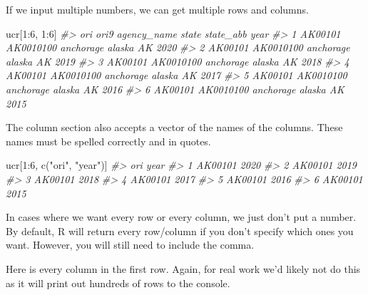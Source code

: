 \documentclass[
]{krantz}
\makeatletter
\newenvironment{Shaded}{\begin{snugshade}}{\end{snugshade}}
\newcommand{\CommentTok}[1]{\textcolor[rgb]{0.37,0.37,0.37}{\textit{#1}}}
\newcommand{\DecValTok}[1]{\textcolor[rgb]{0.06,0.06,0.06}{#1}}
\newcommand{\FunctionTok}[1]{\textcolor[rgb]{0,0,0}{#1}}
\newcommand{\NormalTok}[1]{#1}
\newcommand{\SpecialCharTok}[1]{\textcolor[rgb]{0,0,0}{#1}}
\newcommand{\StringTok}[1]{\textcolor[rgb]{0.5,0.5,0.5}{#1}}
\newenvironment{kframe}{%
\medskip{}
\setlength{\fboxsep}{.8em}
 \def\at@end@of@kframe{}%
 \ifinner\ifhmode%
  \def\at@end@of@kframe{\end{minipage}}%
  \begin{minipage}{\columnwidth}%
 \fi\fi%
 \def\FrameCommand##1{\hskip\@totalleftmargin \hskip-\fboxsep
 \colorbox{shadecolor}{##1}\hskip-\fboxsep
     \hskip-\linewidth \hskip-\@totalleftmargin \hskip\columnwidth}%
 \MakeFramed {\advance\hsize-\width
   \@totalleftmargin\z@ \linewidth\hsize
   \@setminipage}}%
 {\par\unskip\endMakeFramed%
 \at@end@of@kframe}
\renewenvironment{Shaded}{\begin{kframe}}{\end{kframe}}
\makeatother
\begin{document}
If we input multiple numbers, we can get multiple rows and
columns.

\begin{Shaded}
\begin{Highlighting}[]
\NormalTok{ucr[}\DecValTok{1}\SpecialCharTok{:}\DecValTok{6}\NormalTok{, }\DecValTok{1}\SpecialCharTok{:}\DecValTok{6}\NormalTok{]}
\CommentTok{\#\textgreater{}       ori      ori9 agency\_name  state state\_abb year}
\CommentTok{\#\textgreater{} 1 AK00101 AK0010100   anchorage alaska        AK 2020}
\CommentTok{\#\textgreater{} 2 AK00101 AK0010100   anchorage alaska        AK 2019}
\CommentTok{\#\textgreater{} 3 AK00101 AK0010100   anchorage alaska        AK 2018}
\CommentTok{\#\textgreater{} 4 AK00101 AK0010100   anchorage alaska        AK 2017}
\CommentTok{\#\textgreater{} 5 AK00101 AK0010100   anchorage alaska        AK 2016}
\CommentTok{\#\textgreater{} 6 AK00101 AK0010100   anchorage alaska        AK 2015}
\end{Highlighting}
\end{Shaded}

The column section also accepts a vector of the names of the
columns. These names must be spelled correctly and in
quotes.

\begin{Shaded}
\begin{Highlighting}[]
\NormalTok{ucr[}\DecValTok{1}\SpecialCharTok{:}\DecValTok{6}\NormalTok{, }\FunctionTok{c}\NormalTok{(}\StringTok{"ori"}\NormalTok{, }\StringTok{"year"}\NormalTok{)]}
\CommentTok{\#\textgreater{}       ori year}
\CommentTok{\#\textgreater{} 1 AK00101 2020}
\CommentTok{\#\textgreater{} 2 AK00101 2019}
\CommentTok{\#\textgreater{} 3 AK00101 2018}
\CommentTok{\#\textgreater{} 4 AK00101 2017}
\CommentTok{\#\textgreater{} 5 AK00101 2016}
\CommentTok{\#\textgreater{} 6 AK00101 2015}
\end{Highlighting}
\end{Shaded}

In cases where we want every row or every column, we just
don't put a number. By default, R will return every
row/column if you don't specify which ones you want.
However, you will still need to include the comma.

Here is every column in the first row. Again, for real work
we'd likely not do this as it will print out hundreds of
rows to the console.
\end{document}
